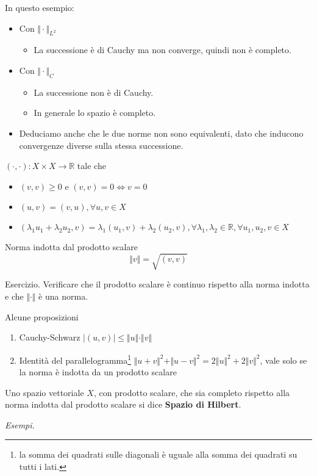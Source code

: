 \documentclass[10pt,a4paper,twoside,openright]{book}
\begin{document}
In questo esempio:
\begin{itemize}
	\item Con $\displaystyle \Vert \cdotp \Vert _{L^{2}}$
	\begin{itemize}
		\item La successione è di Cauchy ma non converge, quindi non è completo.
	\end{itemize}
	\item Con $\Vert \cdotp \Vert _{C}$
	\begin{itemize}
		\item La successione non è di Cauchy.
		\item In generale lo spazio è completo.
	\end{itemize}
	\item Deduciamo anche che le due norme non sono equivalenti, dato che inducono convergenze diverse sulla stessa successione.
\end{itemize}

\begin{definition}
	 $(\cdotp,\cdotp) :X\times X\rightarrow \mathbb{R}$ tale che
	\begin{itemize}
		\item $(v,v) \geqslant 0$ e $(v,v) =0\Leftrightarrow v=0$
		\item $(u,v) =(v,u),\forall u,v\in X$
		\item $(\lambda _{1} u_{1} +\lambda _{2} u_{2},v) =\lambda _{1}(u_{1},v) +\lambda _{2}(u_{2},v),\forall \lambda _{1},\lambda _{2} \in \mathbb{R},\forall u_{1},u_{2},v\in X$
	\end{itemize}
\end{definition}
\begin{definition}
	Norma indotta dal prodotto scalare
	\begin{equation*}
		\Vert v\Vert =\sqrt{(v,v)}
	\end{equation*}
\end{definition}
Esercizio. Verificare che il prodotto scalare è continuo rispetto alla norma indotta e che $\Vert \cdotp \Vert $ è una norma.
\begin{theorem}
	Alcune proposizioni
	\begin{enumerate}
		\item Cauchy-Schwarz $| (u,v)| \leqslant \Vert u\Vert \cdotp \Vert v\Vert $
		\item Identità del parallelogramma\footnote{la somma dei quadrati sulle diagonali è uguale alla somma dei quadrati su tutti i lati.} $\Vert u+v\Vert ^{2} +\Vert u-v\Vert ^{2} =2\Vert u\Vert ^{2} +2\Vert v\Vert ^{2}$, vale solo se la norma è indotta da un prodotto scalare
	\end{enumerate}
\end{theorem}
\begin{definition}
	Uno spazio vettoriale $X$, con prodotto scalare, che sia completo rispetto alla norma indotta dal prodotto scalare si dice \textbf{Spazio di Hilbert}.
\end{definition}
\textit{Esempi.}
\end{document}
